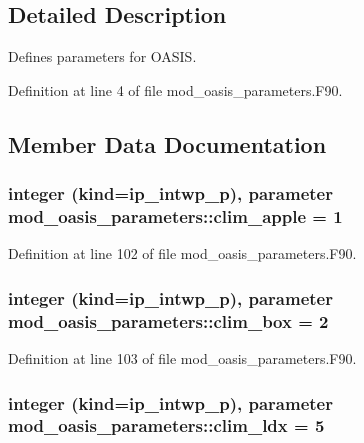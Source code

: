 \subsection{Detailed Description}
Defines parameters for O\+A\+S\+I\+S. 

Definition at line 4 of file mod\+\_\+oasis\+\_\+parameters.\+F90.



\subsection{Member Data Documentation}
\hypertarget{classmod__oasis__parameters_a3cfd98fdd1c2fac653b182454c87f4aa}{
\subsubsection[{clim\+\_\+apple}]{\setlength{\rightskip}{0pt plus 5cm}integer (kind=ip\+\_\+intwp\+\_\+p), parameter mod\+\_\+oasis\+\_\+parameters\+::clim\+\_\+apple = 1}}\label{classmod__oasis__parameters_a3cfd98fdd1c2fac653b182454c87f4aa}


Definition at line 102 of file mod\+\_\+oasis\+\_\+parameters.\+F90.

\hypertarget{classmod__oasis__parameters_a9a8b38629274e3a38a37f329ce9d2aa2}{
\subsubsection[{clim\+\_\+box}]{\setlength{\rightskip}{0pt plus 5cm}integer (kind=ip\+\_\+intwp\+\_\+p), parameter mod\+\_\+oasis\+\_\+parameters\+::clim\+\_\+box = 2}}\label{classmod__oasis__parameters_a9a8b38629274e3a38a37f329ce9d2aa2}


Definition at line 103 of file mod\+\_\+oasis\+\_\+parameters.\+F90.

\hypertarget{classmod__oasis__parameters_a3407c11054d24782182c649307808e47}{
\subsubsection[{clim\+\_\+ldx}]{\setlength{\rightskip}{0pt plus 5cm}integer (kind=ip\+\_\+intwp\+\_\+p), parameter mod\+\_\+oasis\+\_\+parameters\+::clim\+\_\+ldx = 5}}\label{classmod__oasis__parameters_a3407c11054d24782182c649307808e47}


